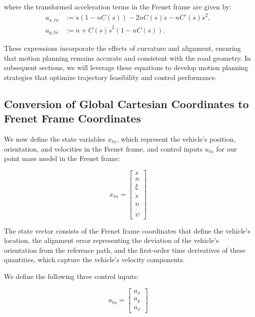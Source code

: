 where the transformed acceleration terms in the Frenet frame are given by:
\begin{align}
	a_{x,tn} & := \ddot{s}(1 - nC(s)) - 2\dot{n}
	C(s)\dot{s} - nC'(s)\dot{s}^2, \label{def:axtn} \\ a_{y,tn} & := \ddot{n} + C(s)\dot{s}^2(1 - nC(s)).
	   \label{def:aytn}
\end{align}

These expressions incorporate the effects of curvature and alignment, ensuring that motion planning remains accurate and consistent with the road
geometry.
In subsequent sections, we will leverage these equations to develop motion planning strategies that optimize trajectory feasibility and control
performance.

\subsection{Conversion of Global Cartesian Coordinates to Frenet Frame Coordinates} \label{subsec:pm_conversion_of_cartesian_to_frenet}

We now define the state variables $x_{tn}$, which represent the vehicle's position, orientation, and velocities in the Frenet frame, and control inputs $u_{tn}$ for our point mass model in the Frenet frame:

\begin{equation}
	x_{tn} = \begin{bmatrix}
		s       \\
		n       \\
		\xi     \\
		\dot{s} \\
		\dot{n} \\
		\dot{\psi}
	\end{bmatrix}
\end{equation}

The state vector consists of the Frenet frame coordinates that define the vehicle's location, the alignment error representing the deviation of the
vehicle's orientation from the reference path, and the first-order time derivatives of these quantities, which capture the vehicle's velocity
components.

We define the following three control inputs:

\begin{equation}
	u_{tn} = \begin{bmatrix}
		a_{x} \\
		a_{y} \\
		a_\psi
	\end{bmatrix}
\end{equation}

